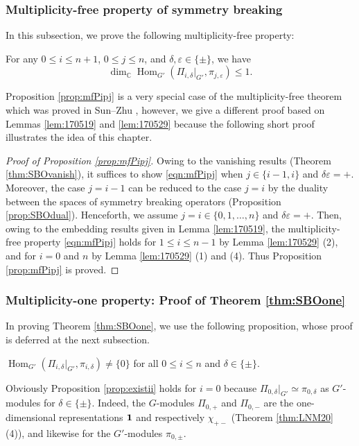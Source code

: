 \subsubsection{Multiplicity-free property of symmetry breaking}
In this subsection,
 we prove the following multiplicity-free property:
\begin{proposition}
\label{prop:mfPipj}
For any $0 \le i \le n+1$, 
 $0 \le j \le n$, 
 and $\delta, \varepsilon \in \{\pm\}$, 
 we have
\begin{equation}
\label{eqn:mfPipj}
   \dim_{\mathbb{C}}{\operatorname{Hom}}_{G'}
   (\Pi_{i,\delta}|_{G'},\pi_{j,\varepsilon}) \le 1.  
\end{equation}
\end{proposition}
Proposition \ref{prop:mfPipj} is a very special case 
 of the multiplicity-free theorem 
 which was proved in Sun--Zhu \cite{SunZhu}, 
 however,
 we give a different proof based on Lemmas \ref{lem:170519}
 and \ref{lem:170529}
 because the following short proof illustrates the idea of this chapter.  
\begin{proof}
[Proof of Proposition \ref{prop:mfPipj}]
Owing to the vanishing results (Theorem \ref{thm:SBOvanish}), 
 it suffices to show \eqref{eqn:mfPipj}
when $j \in \{i-1,i\}$ and $\delta \varepsilon=+$.  
Moreover,
 the case $j=i-1$ can be reduced to the case $j=i$
 by the duality
 between the spaces of symmetry breaking operators
 (Proposition \ref{prop:SBOdual}).  
Henceforth, 
 we assume $j=i \in \{0,1,\ldots,n\}$
 and $\delta \varepsilon =+$.  
Then, 
 owing to the embedding results given in Lemma \ref{lem:170519}, 
the multiplicity-free property
 \eqref{eqn:mfPipj} holds for $1 \le i \le n-1$
 by Lemma \ref{lem:170529} (2), 
 and for $i =0$ and $n$ by Lemma \ref{lem:170529} (1) and (4).  
Thus Proposition \ref{prop:mfPipj} is proved.  
\end{proof}

\subsubsection{Multiplicity-one property: Proof of Theorem \ref{thm:SBOone}}
\label{subsec:pfSBOone}

In proving Theorem \ref{thm:SBOone}, 
 we use the following proposition,
 whose proof is deferred at the next subsection.  
\begin{proposition}
\label{prop:existii}
 ${\operatorname{Hom}}_{G'}(\Pi_{i,\delta}|_{G'}, \pi_{i,\delta}) \ne \{0\}$
 for all $0 \le i \le n$ and $\delta \in \{\pm\}$.  
\end{proposition}
\begin{remark}
\label{rem:existii}
Obviously Proposition \ref{prop:existii} holds for $i=0$
 because $\Pi_{0,\delta}|_{G'} \simeq \pi_{0,\delta}$ as $G'$-modules
 for $\delta \in \{\pm\}$.  
Indeed, 
 the $G$-modules $\Pi_{0,+}$ and $\Pi_{0,-}$ are the one-dimensional representations
 ${\bf{1}}$ and respectively
 $\chi_{+-}$ 
 (Theorem \ref{thm:LNM20} (4)),
 and likewise for the $G'$-modules $\pi_{0,\pm}$.  
\end{remark}

